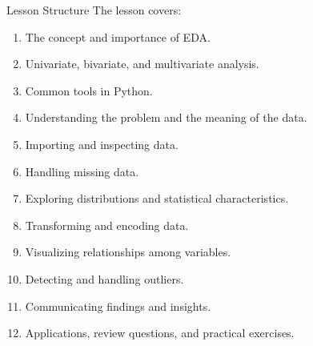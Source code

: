 \documentclass[aspectratio=169,11pt]{beamer}
\begin{document}
\begin{frame}[allowframebreaks]{Lesson Structure}
\small
The lesson covers:\par\medskip
\begin{enumerate}
\item The concept and importance of EDA.
\item Univariate, bivariate, and multivariate analysis.
\item Common tools in Python.
\item Understanding the problem and the meaning of the data.
\item Importing and inspecting data.
\item Handling missing data.
\item Exploring distributions and statistical characteristics.
\item Transforming and encoding data.
\item Visualizing relationships among variables.
\item Detecting and handling outliers.
\item Communicating findings and insights.
\item Applications, review questions, and practical exercises.
\end{enumerate}
\end{frame}
\end{document}
